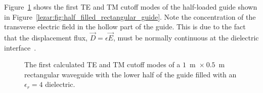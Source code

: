 Figure~\ref{lezar:fig:half_filled_rectangular_cutoff_modes} shows the first
TE and TM cutoff modes of the half-loaded guide shown in
Figure~\ref{lezar:fig:half_filled_rectangular_guide}. Note the concentration
of the transverse electric field in the hollow part of the guide. This
is due to the fact that the displacement flux, $\vec{D} =
\epsilon\vec{E}$, must be normally continuous at the dielectric
interface~\cite{Pozar2005, Smi1997}.
\begin{figure}[h]
\centering
\caption{The first calculated TE and TM cutoff modes of a $1$~m~$\times~0.5$~m rectangular waveguide with the lower half of the guide filled with an $\epsilon_r = 4$ dielectric.}
\label{lezar:fig:half_filled_rectangular_cutoff_modes}
\end{figure}

